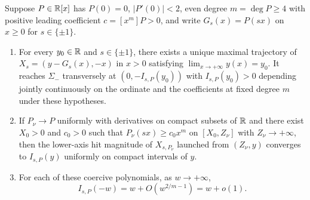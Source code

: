 \begin{lemma}\label{lem:incoming-rays}
Suppose $P\in\mathbb{R}[x]$ has $P(0)=0$, $|P'(0)|<2$, even degree $m=\deg P\ge 4$ with positive leading coefficient $c=[x^m]P>0$, and write $G_s(x)=P(sx)$ on $x\ge 0$ for $s\in\{\pm 1\}$.
\begin{enumerate}
  \item[\textup{(i)}] For every $y_0\in\mathbb{R}$ and $s\in\{\pm 1\}$, there exists a unique maximal trajectory of $X_s=(y-G_s(x),-x)$ in $x>0$ satisfying $\lim_{x\to+\infty}y(x)=y_0$. It reaches $\Sigma_-$ transversely at $(0,-I_{s,P}(y_0))$ with $I_{s,P}(y_0)>0$ depending jointly continuously on the ordinate and the coefficients at fixed degree $m$ under these hypotheses.
  \item[\textup{(ii)}] If $P_\nu\to P$ uniformly with derivatives on compact subsets of $\mathbb{R}$ and there exist $X_0>0$ and $c_0>0$ such that $P_\nu(sx)\ge c_0 x^m$ on $[X_0,Z_\nu]$ with $Z_\nu\to+\infty$, then the lower-axis hit magnitude of $X_{s,P_\nu}$ launched from $(Z_\nu,y)$ converges to $I_{s,P}(y)$ uniformly on compact intervals of $y$.
  \item[\textup{(iii)}] For each of these coercive polynomials, as $w\to+\infty$,
  \begin{equation}\label{eq:incoming-neg-tail}
    I_{s,P}(-w) = w + O\!\left(w^{2/m-1}\right) = w + o(1).
  \end{equation}
\end{enumerate}
\end{lemma}

